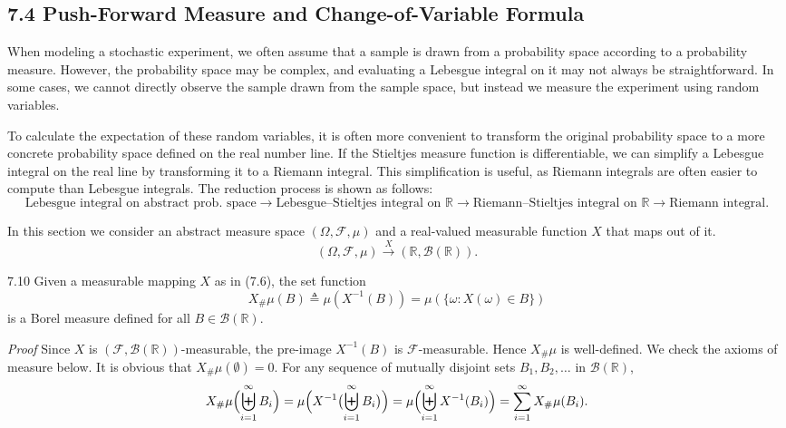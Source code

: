 \subsection*{7.4 Push-Forward Measure and Change-of-Variable Formula}

When modeling a stochastic experiment, we often assume that a sample is drawn from a probability space according to a probability measure. However, the probability space may be complex, and evaluating a Lebesgue integral on it may not always be straightforward. In some cases, we cannot directly observe the sample drawn from the sample space, but instead we measure the experiment using random variables.

To calculate the expectation of these random variables, it is often more convenient to transform the original probability space to a more concrete probability space defined on the real number line. If the Stieltjes measure function is differentiable, we can simplify a Lebesgue integral on the real line by transforming it to a Riemann integral. This simplification is useful, as Riemann integrals are often easier to compute than Lebesgue integrals. The reduction process is shown as follows:
\[
\text{Lebesgue integral on abstract prob. space}
\to
\text{Lebesgue--Stieltjes integral on } \mathbb{R}
\to
\text{Riemann--Stieltjes integral on } \mathbb{R}
\to
\text{Riemann integral}.
\]

In this section we consider an abstract measure space $(\Omega,\mathcal{F},\mu)$ and a real-valued measurable function $X$ that maps out of it.
\begin{equation}
(\Omega,\mathcal{F},\mu) \xrightarrow{X} (\mathbb{R},\mathcal{B}(\mathbb{R})).
\tag{7.6}
\end{equation}

\begin{thmbox}{7.10}
Given a measurable mapping $X$ as in (7.6), the set function
\[
X_{\#}\mu(B)\triangleq \mu(X^{-1}(B))=\mu(\{\omega : X(\omega)\in B\})
\]
is a Borel measure defined for all $B\in \mathcal{B}(\mathbb{R})$.
\end{thmbox}

\textit{Proof} Since $X$ is $(\mathcal{F},\mathcal{B}(\mathbb{R}))$-measurable, the pre-image $X^{-1}(B)$ is $\mathcal{F}$-measurable. Hence $X_{\#}\mu$ is well-defined. We check the axioms of measure below. It is obvious that $X_{\#}\mu(\emptyset)=0$. For any sequence of mutually disjoint sets $B_1,B_2,\dots$ in $\mathcal{B}(\mathbb{R})$,
\[
X_{\#}\mu\Bigl(\biguplus_{i=1}^{\infty} B_i\Bigr)
=
\mu\Bigl(X^{-1}\bigl(\biguplus_{i=1}^{\infty} B_i\bigr)\Bigr)
=
\mu\Bigl(\biguplus_{i=1}^{\infty} X^{-1}(B_i)\Bigr)
=
\sum_{i=1}^{\infty} X_{\#}\mu(B_i).
\]

